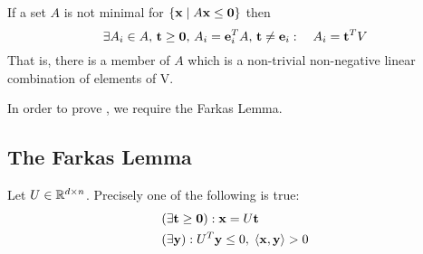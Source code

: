 \begin{Prop}\label{a_not_minimal}
	If a set $A$ is not minimal for $\left\{\mathbf{x}\;|\; A\mathbf{x}\leq\mathbf{0}\right\}$ then
	\[\exists A_i\in A,\, \mathbf{t}\geq\mathbf{0},\, A_i=\mathbf{e}_i^T A,\,\mathbf{t}\neq\mathbf{e}_i:\quad A_i = \mathbf{t}^T V \]
	That is, there is a member of $A$ which is a non-trivial non-negative linear combination of elements of V.
\end{Prop}

In order to prove , we require the Farkas Lemma.

\subsection{The Farkas Lemma}

\begin{Prop}\label{farkas_lemma}
	Let $U \in \mathbb{R}^{d\times n}$.  Precisely one of the following is true:
	\begin{align*}
		 & (\exists \mathbf{t} \geq \mathbf{0}) : \mathbf{x} = U\mathbf{t}                \\
		 & (\exists \mathbf{y}) : U^T\mathbf{y} \leq 0,\; \left\langle \mathbf{x}, \mathbf{y} \right\rangle > 0
	\end{align*}
\end{Prop}

